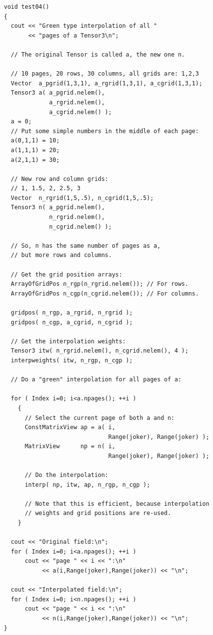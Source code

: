 \begin{lstlisting}
void test04()
{
  cout << "Green type interpolation of all "
       << "pages of a Tensor3\n";

  // The original Tensor is called a, the new one n. 

  // 10 pages, 20 rows, 30 columns, all grids are: 1,2,3
  Vector  a_pgrid(1,3,1), a_rgrid(1,3,1), a_cgrid(1,3,1); 
  Tensor3 a( a_pgrid.nelem(),
             a_rgrid.nelem(),
             a_cgrid.nelem() ); 
  a = 0;
  // Put some simple numbers in the middle of each page:
  a(0,1,1) = 10;
  a(1,1,1) = 20;
  a(2,1,1) = 30;

  // New row and column grids:
  // 1, 1.5, 2, 2.5, 3
  Vector  n_rgrid(1,5,.5), n_cgrid(1,5,.5); 
  Tensor3 n( a_pgrid.nelem(),
             n_rgrid.nelem(),
             n_cgrid.nelem() ); 

  // So, n has the same number of pages as a, 
  // but more rows and columns.

  // Get the grid position arrays:
  ArrayOfGridPos n_rgp(n_rgrid.nelem()); // For rows.
  ArrayOfGridPos n_cgp(n_cgrid.nelem()); // For columns.

  gridpos( n_rgp, a_rgrid, n_rgrid );
  gridpos( n_cgp, a_cgrid, n_cgrid );

  // Get the interpolation weights:
  Tensor3 itw( n_rgrid.nelem(), n_cgrid.nelem(), 4 );
  interpweights( itw, n_rgp, n_cgp );

  // Do a "green" interpolation for all pages of a:

  for ( Index i=0; i<a.npages(); ++i )
    {
      // Select the current page of both a and n:
      ConstMatrixView ap = a( i,
                              Range(joker), Range(joker) );
      MatrixView      np = n( i,
                              Range(joker), Range(joker) );

      // Do the interpolation:
      interp( np, itw, ap, n_rgp, n_cgp );

      // Note that this is efficient, because interpolation
      // weights and grid positions are re-used.
    }

  cout << "Original field:\n";
  for ( Index i=0; i<a.npages(); ++i )
      cout << "page " << i << ":\n"
           << a(i,Range(joker),Range(joker)) << "\n";

  cout << "Interpolated field:\n";
  for ( Index i=0; i<n.npages(); ++i )
      cout << "page " << i << ":\n"
           << n(i,Range(joker),Range(joker)) << "\n";
}
\end{lstlisting}

